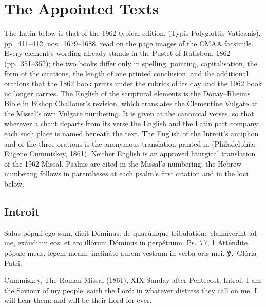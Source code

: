 \section{The Appointed Texts}
\label{sec:appointed-texts}

The Latin below is that of the 1962 typical edition, 
(Typis Polyglottis Vaticanis), pp.~411--412, nos.~1679--1688, read on the page
images of the CMAA facsimile. Every element's wording already stands in the
Pustet  of Ratisbon, 1862 (pp.~351--352); the two books
differ only in spelling, pointing, capitalisation, the form of the citations,
the length of one printed conclusion, and the additional orations that the
1862 book prints under the rubrics of its day and the 1962 book no longer
carries. The English of the scriptural elements is the Douay--Rheims Bible in
Bishop Challoner's revision, which translates the Clementine Vulgate at the
Missal's own Vulgate numbering. It is given at the canonical verses, so that
wherever a chant departs from its verse the English and the Latin part company;
each such place is named beneath the text. The English of the Introit's
antiphon and of the three orations is the anonymous translation printed in
 (Philadelphia: Eugene Cummiskey, 1861). Neither English is an approved
liturgical translation of the 1962 Missal. Psalms are cited in the Missal's
numbering; the Hebrew numbering follows in parentheses at each psalm's first
citation and in the loci below.

\subsection{Introit}
\label{proper-introit}


\begin{latinproper}
Salus pópuli ego sum, dicit Dóminus: de quacúmque tribulatióne clamáverint ad
me, exáudiam eos: et ero illórum Dóminus in perpétuum. \textnormal{Ps.\ 77, 1}
Atténdite, pópule meus, legem meam: inclináte aurem vestram in verba oris mei.
℣.~Glória Patri.
\end{latinproper}

\begin{englishwitness}{Cummiskey, The Roman Missal (1861), XIX Sunday after Pentecost, Introit}
I am the Saviour of my people, saith the Lord: in whatever distress they call
on me, I will hear them: and will be their Lord for ever.
\end{englishwitness}


